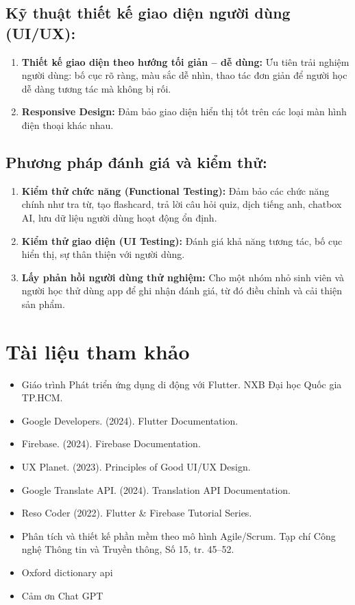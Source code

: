     \subsection{Kỹ thuật thiết kế giao diện người dùng (UI/UX):} 
    \begin{enumerate}
    
    \item \textbf{Thiết kế giao diện theo hướng tối giản – dễ dùng:} Ưu tiên trải nghiệm người dùng: bố cục rõ ràng, màu sắc dễ nhìn, thao tác đơn giản để người học dễ dàng tương tác mà không bị rối.
    \item \textbf{Responsive Design:} Đảm bảo giao diện hiển thị tốt trên các loại màn hình điện thoại khác nhau.
    \end{enumerate}
    
    \subsection{Phương pháp đánh giá và kiểm thử:} 
    \begin{enumerate}

    \item \textbf{Kiểm thử chức năng (Functional Testing):} Đảm bảo các chức năng chính như tra từ, tạo flashcard, trả lời câu hỏi quiz, dịch tiếng anh, chatbox AI, lưu dữ liệu người dùng hoạt động ổn định.
    \item \textbf{Kiểm thử giao diện (UI Testing):} Đánh giá khả năng tương tác, bố cục hiển thị, sự thân thiện với người dùng.
    \item \textbf{Lấy phản hồi người dùng thử nghiệm:} Cho một nhóm nhỏ sinh viên và người học thử dùng app để ghi nhận đánh giá, từ đó điều chỉnh và cải thiện sản phẩm.

\end{enumerate}
\section{ Tài liệu tham khảo}
\begin{itemize}
    \item \textbf{ }Giáo trình Phát triển ứng dụng di động với Flutter. NXB Đại học Quốc gia TP.HCM.
    \item \textbf{ }Google Developers. (2024). Flutter Documentation.
    \item \textbf{ }Firebase. (2024). Firebase Documentation.
   \item \textbf{ }UX Planet. (2023). Principles of Good UI/UX Design.
   \item \textbf{ }Google Translate API. (2024). Translation API Documentation. 
    \item \textbf{ }Reso Coder (2022). Flutter & Firebase Tutorial Series.
    \item \textbf{ }Phân tích và thiết kế phần mềm theo mô hình Agile/Scrum. Tạp chí Công nghệ Thông tin và Truyền thông, Số 15, tr. 45–52.
     \item \textbf{ }Oxford dictionary api
      \item \textbf{ }Cảm ơn Chat GPT

    \end{itemize}


\setcounter{section}{0}
\newpage

